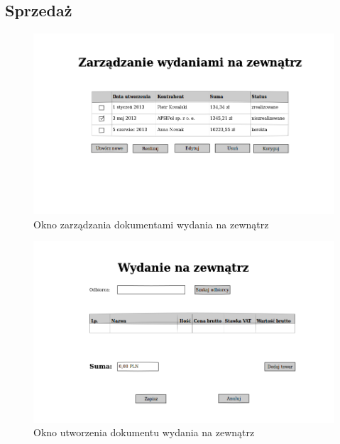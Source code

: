\subsection{Sprzedaż}

\begin{figure}[!htb]
  \begin{center}
    \includegraphics[scale=0.45]{../img/interfejs/zarzadzanie-dokumentami-WZ.png}
  \end{center}
  \caption{Okno zarządzania dokumentami wydania na zewnątrz}
\end{figure}
\FloatBarrier

\begin{figure}[!htb]
  \begin{center}
    \includegraphics[scale=0.45]{../img/interfejs/utworzenie-wydania-na-zewnatrz.png}
  \end{center}
  \caption{Okno utworzenia dokumentu wydania na zewnątrz}
\end{figure}
\FloatBarrier

